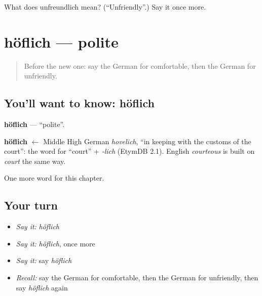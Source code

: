 \begin{tcolorbox}[breakable,colback=teal!4,colframe=teal!35!black,title={Before you move on}]
What does unfreundlich mean? (\textquotedblleft{}Unfriendly\textquotedblright{}.) Say it once more.
\end{tcolorbox}
\section[höflich]{höflich — polite}

\label{lesson:GE-C167-hoeflich}



\begin{quote}
Before the new one: say the German for comfortable, then the German for unfriendly.
\end{quote}

\subsection*{You'll want to know: höflich}
\textbf{höflich} — \textquotedblleft{}polite\textquotedblright{}.

\begin{cousinweb}
\textbf{höflich} $\leftarrow$ Middle High German \emph{hovelich}, \textquotedblleft{}in keeping with the customs of the court\textquotedblright{}: the word for \textquotedblleft{}court\textquotedblright{} + \emph{-lich} (EtymDB 2.1). English \emph{courteous} is built on \emph{court} the same way.
\end{cousinweb}

\begin{grammarlens}[title={What you've built}]
One more word for this chapter.
\end{grammarlens}

\subsection*{Your turn}
\begin{itemize}
\raggedright
  \item \emph{Say it:} \emph{höflich}
  \item \emph{Say it:} \emph{höflich}, once more
  \item \emph{Say it:} say \emph{höflich}
  \item \emph{Recall:} say the German for comfortable, then the German for unfriendly, then say \emph{höflich} again
\end{itemize}

